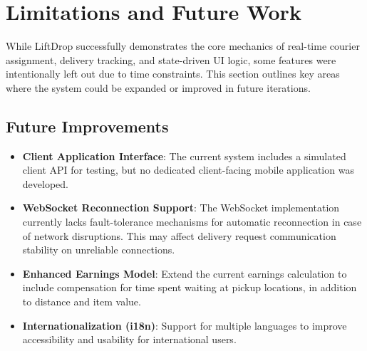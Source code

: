 \section{Limitations and Future Work}

While LiftDrop successfully demonstrates the core mechanics of real-time courier assignment, delivery tracking, and state-driven UI logic, some features were intentionally left out due to time constraints. This section outlines key areas where the system could be expanded or improved in future iterations.

\subsection{Future Improvements}

\begin{itemize}
    \item \textbf{Client Application Interface}: The current system includes a simulated client API for testing, but no dedicated client-facing mobile application was developed.

    \item \textbf{WebSocket Reconnection Support}: The WebSocket implementation currently lacks fault-tolerance mechanisms for automatic reconnection in case of network disruptions. This may affect delivery request communication stability on unreliable connections.
    
    \item \textbf{Enhanced Earnings Model}: Extend the current earnings calculation to include compensation for time spent waiting at pickup locations, in addition to distance and item value.

     \item \textbf{Internationalization (i18n)}: Support for multiple languages to improve accessibility and usability for international users.
\end{itemize}
